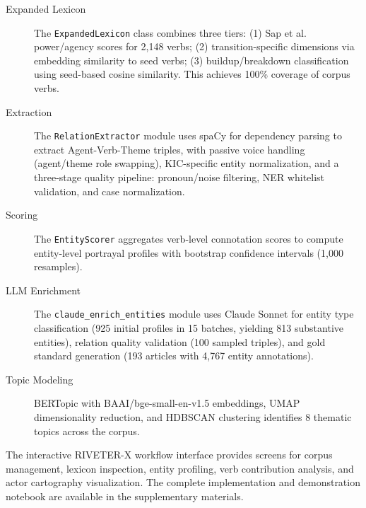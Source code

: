 \documentclass[../main.tex]{subfiles}
\begin{document}
\begin{description}
    \item[Expanded Lexicon] The \texttt{ExpandedLexicon} class combines three tiers: (1) Sap et al. power/agency scores for 2,148 verbs; (2) transition-specific dimensions via embedding similarity to seed verbs; (3) buildup/breakdown classification using seed-based cosine similarity. This achieves 100\% coverage of corpus verbs.

    \item[Extraction] The \texttt{RelationExtractor} module uses spaCy for dependency parsing to extract Agent-Verb-Theme triples, with passive voice handling (agent/theme role swapping), KIC-specific entity normalization, and a three-stage quality pipeline: pronoun/noise filtering, NER whitelist validation, and case normalization.

    \item[Scoring] The \texttt{EntityScorer} aggregates verb-level connotation scores to compute entity-level portrayal profiles with bootstrap confidence intervals (1,000 resamples).

    \item[LLM Enrichment] The \texttt{claude\_enrich\_entities} module uses Claude Sonnet for entity type classification (925 initial profiles in 15 batches, yielding 813 substantive entities), relation quality validation (100 sampled triples), and gold standard generation (193 articles with 4,767 entity annotations).

    \item[Topic Modeling] BERTopic with BAAI/bge-small-en-v1.5 embeddings, UMAP dimensionality reduction, and HDBSCAN clustering identifies 8 thematic topics across the corpus.
\end{description}

\noindent The interactive RIVETER-X workflow interface provides screens for corpus management, lexicon inspection, entity profiling, verb contribution analysis, and actor cartography visualization. The complete implementation and demonstration notebook are available in the supplementary materials.
\end{document}
